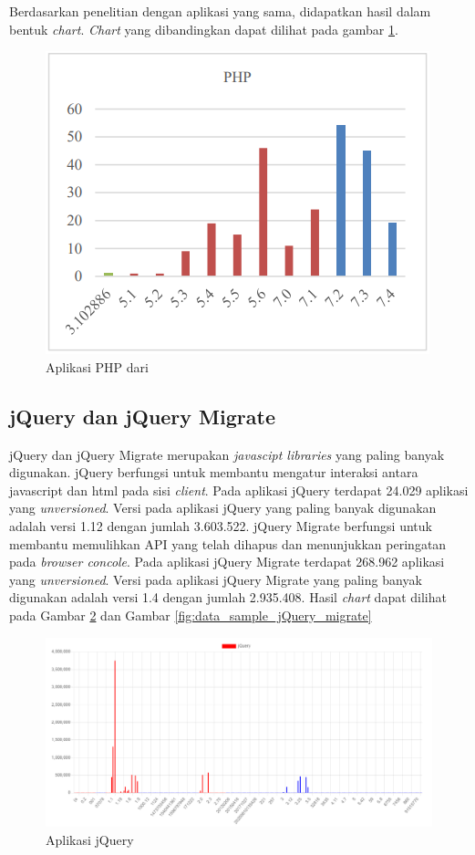 Berdasarkan penelitian dengan aplikasi yang sama, didapatkan hasil dalam bentuk \textit{chart}. \textit{Chart} yang dibandingkan dapat dilihat pada gambar \ref{fig:data_sample_php_p}.

\begin{figure}[H]
	\centering  
	\includegraphics[scale=0.7]{Gambar/chart_pascal_php.PNG}  
	\caption{Aplikasi PHP dari \cite{pascal}} 
	\label{fig:data_sample_php_p} 
\end{figure}

\subsection{jQuery dan jQuery Migrate}
jQuery dan jQuery Migrate merupakan \textit{javascipt libraries} yang paling banyak digunakan. jQuery berfungsi untuk membantu mengatur interaksi antara javascript dan html pada sisi \textit{client}. Pada aplikasi jQuery terdapat 24.029 aplikasi yang \textit{unversioned}. Versi pada aplikasi jQuery yang paling banyak digunakan adalah versi 1.12 dengan jumlah 3.603.522. jQuery Migrate berfungsi untuk membantu memulihkan API yang telah dihapus dan menunjukkan peringatan pada \textit{browser concole}. Pada aplikasi jQuery Migrate terdapat 268.962 aplikasi yang \textit{unversioned}. Versi pada aplikasi jQuery Migrate yang paling banyak digunakan adalah versi 1.4 dengan jumlah 2.935.408. Hasil \textit{chart} dapat dilihat pada Gambar \ref{fig:data_sample_jQuery} dan Gambar \ref{fig:data_sample_jQuery_migrate}
\begin{figure}[H]
	\centering  
	\includegraphics[scale=0.7]{Gambar/data_sample_jQuery.png}  
	\caption{Aplikasi jQuery} 
	\label{fig:data_sample_jQuery} 
\end{figure}

